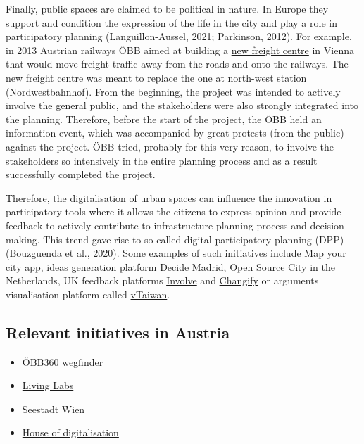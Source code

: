 \documentclass[
]{book}
\providecommand{\tightlist}{%
  \setlength{\itemsep}{0pt}\setlength{\parskip}{0pt}}
\begin{document}
Finally, public spaces are claimed to be political in nature. In Europe they support and condition the expression of the life in the city and play a role in participatory planning (Languillon-Aussel, 2021; Parkinson, 2012). For example, in 2013 Austrian railways ÖBB aimed at building a \href{https://www.partizipation.at/gueterzentrum_sued.html}{new freight centre} in Vienna that would move freight traffic away from the roads and onto the railways. The new freight centre was meant to replace the one at north-west station (Nordwestbahnhof). From the beginning, the project was intended to actively involve the general public, and the stakeholders were also strongly integrated into the planning. Therefore, before the start of the project, the ÖBB held an information event, which was accompanied by great protests (from the public) against the project. ÖBB tried, probably for this very reason, to involve the stakeholders so intensively in the entire planning process and as a result successfully completed the project.

Therefore, the digitalisation of urban spaces can influence the innovation in participatory tools where it allows the citizens to express opinion and provide feedback to actively contribute to infrastructure planning process and decision-making. This trend gave rise to so-called digital participatory planning (DPP) (Bouzguenda et al., 2020). Some examples of such initiatives include \href{https://mapyour.city/}{Map your city} app, ideas generation platform \href{https://www.involve.org.uk/resources/case-studies/decide-madrid}{Decide Madrid}, \href{https://oscity.nl/}{Open Source City} in the Netherlands, UK feedback platforms \href{https://www.involve.org.uk/resources/knowledge-base/what/public-participation}{Involve} and \href{http://www.changify.org/}{Changify} or arguments visualisation platform called \href{https://www.nesta.org.uk/feature/six-pioneers-digital-democracy/vtaiwan/}{vTaiwan}.

\hypertarget{relevant-initiatives-in-austria-5}{%
\subsection*{Relevant initiatives in Austria}\label{relevant-initiatives-in-austria-5}}

\begin{itemize}
\tightlist
\item
  \href{https://wegfinder.at/presse/2021/mit-wegfinder-ist-mobility-as-a-service-in-oesterreich-angekommen(1)/}{ÖBB360 wegfinder}
\item
  \href{https://austriatech.at/en/insight-into-the-work-of-the-urban-mobility-laboratories/}{Living Labs}
\item
  \href{https://www.aspern-seestadt.at/en}{Seestadt Wien}
\item
  \href{https://ec.europa.eu/regional_policy/en/projects/Austria/support-for-digital-transformation-in-lower-austria}{House of digitalisation}
\end{itemize}
\end{document}
